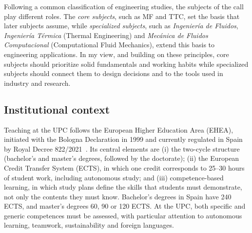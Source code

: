\documentclass[11pt]{article}
\newcommand{\NEW}[1]{\iffinal #1\else{\color{red}#1}\fi}
\begin{document}
\begin{itemize}
\end{itemize}

Following a common classification of engineering studies, the subjects of the call play different roles.
The \emph{core subjects}, such as MF and TTC, set the basis that later subjects assume, while \emph{specialized subjects}, such as \textit{Ingenier\'ia de Fluidos}, \textit{Ingenier\'ia T\'ermica} (Thermal Engineering) and \textit{Mec\'anica de Fluidos Computacional} (Computational Fluid Mechanics), extend this basis to engineering applications. 
In my view, and building on these principles, core subjects should prioritize solid fundamentals and working habits while specialized subjects should connect them to design decisions and to the tools used in industry and research.


\newpage
\subsection{Institutional context}\label{sec:context}

Teaching at the UPC follows the European Higher Education Area (EHEA), initiated with the Bologna Declaration in 1999 and currently regulated in Spain by Royal Decree 822/2021~\cite{RD822}. 
Its central elements are 
(i) the two-cycle structure (bachelor's and master's degrees, followed by the doctorate); 
(ii) the European Credit Transfer System (ECTS), in which one credit corresponds to 25--30 hours of student work, including autonomous study; and 
(iii) competence-based learning, in which study plans define the skills that students must demonstrate, not only the contents they must know. 
Bachelor's degrees in Spain have 240 ECTS, and master's degrees 60, 90 or 120 ECTS. 
At the UPC, \NEW{both} specific and generic competences must be assessed, with particular attention to autonomous learning, teamwork, sustainability and foreign languages.
\end{document}
